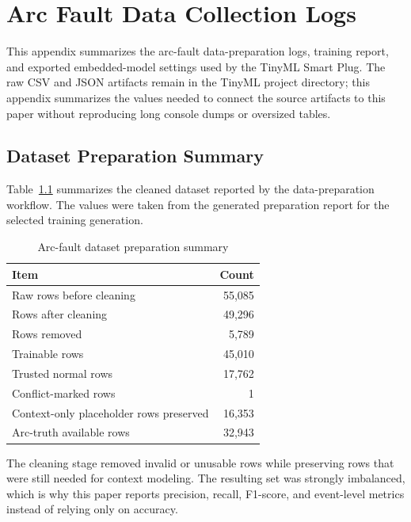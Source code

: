 \chapter{Arc Fault Data Collection Logs}
\label{app:f}

This appendix summarizes the arc-fault data-preparation logs, training report,
and exported embedded-model settings used by the TinyML Smart Plug. The raw
CSV and JSON artifacts remain in the TinyML project directory; this appendix
summarizes the values needed to connect the source artifacts to this paper
without reproducing long console dumps or oversized tables.

\section{Dataset Preparation Summary}
\label{app:f-dataset-preparation}

Table~\ref{tab:app-f-dataset-cleaning} summarizes the cleaned dataset reported
by the data-preparation workflow. The values were taken from the generated
preparation report for the selected training generation.
\begin{table}[H]
  \centering
  \caption{Arc-fault dataset preparation summary}
  \label{tab:app-f-dataset-cleaning}
  \begin{tabular}{lr}
    \toprule
    \textbf{Item} & \textbf{Count} \\
    \midrule
    Raw rows before cleaning & 55,085 \\
    Rows after cleaning & 49,296 \\
    Rows removed & 5,789 \\
    Trainable rows & 45,010 \\
    Trusted normal rows & 17,762 \\
    Conflict-marked rows & 1 \\
    Context-only placeholder rows preserved & 16,353 \\
    Arc-truth available rows & 32,943 \\
    \bottomrule
  \end{tabular}
\end{table}

The cleaning stage removed invalid or unusable rows while preserving rows that
were still needed for context modeling. The resulting set was strongly
imbalanced, which is why this paper reports precision, recall, F1-score,
and event-level metrics instead of relying only on accuracy.

